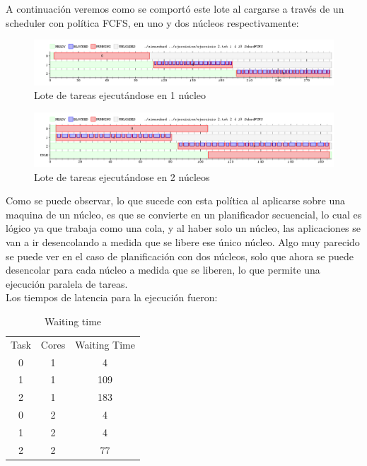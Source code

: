 \documentclass{article}
\begin{document}
A continuación veremos como se comportó este lote al cargarse a través de un scheduler con política FCFS, en uno y dos núcleos respectivamente:

\begin{figure}[h!]
\caption{Lote de tareas ejecutándose en 1 núcleo \label{grf:ex2-1}}
\centering
\includegraphics[width=15cm]{../ejercicios/ejercicio 2 - 1 nucleo}
\end{figure}

\begin{figure}[h!]
\caption{Lote de tareas ejecutándose en 2 núcleos \label{grf:ex2-2}}
\centering
\includegraphics[width=15cm]{../ejercicios/ejercicio 2 - 2 nucleos}
\end{figure}

Como se puede observar, lo que sucede con esta política al aplicarse sobre una maquina de un núcleo, es que se convierte en un planificador secuencial, lo cual es lógico ya que trabaja como una cola, y al haber solo un núcleo, las aplicaciones se van a ir desencolando a medida que se libere ese único núcleo.
Algo muy parecido se puede ver en el caso de planificación con dos núcleos, solo que ahora se puede desencolar para cada núcleo a medida que se liberen, lo que permite una ejecución paralela de tareas.\\
Los tiempos de latencia para la ejecución fueron:
\begin{table}[]
\centering
\caption{Waiting time}
\label{ex2}
\begin{tabular}{ccc}
Task & Cores & Waiting Time \\
0 & 1 & 4 \\
1 & 1 & 109 \\
2 & 1 & 183 \\
0 & 2 & 4 \\
1 & 2 & 4 \\
2 & 2 & 77
\end{tabular}
\end{table}
\end{document}
